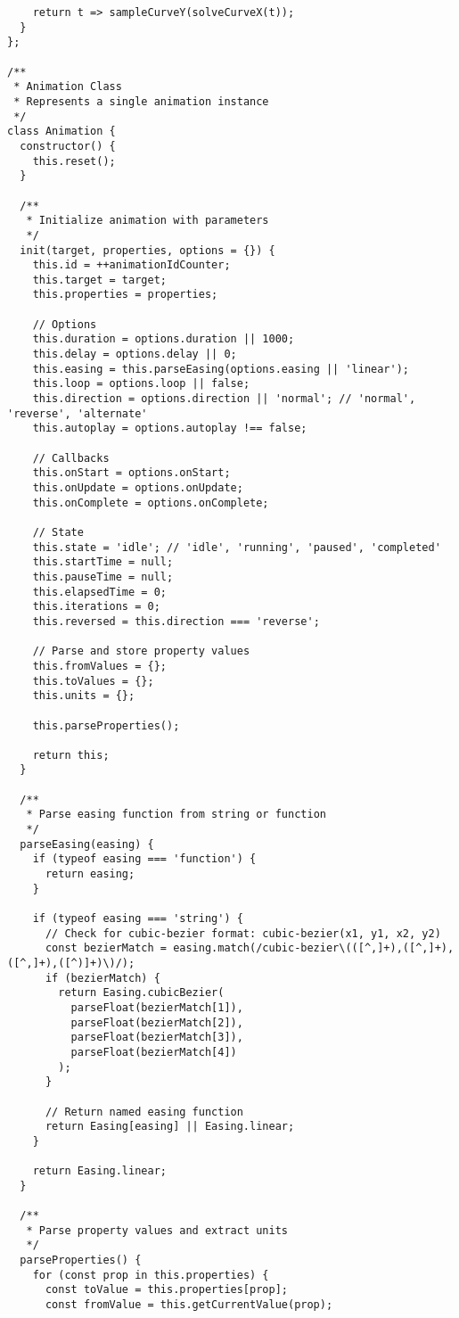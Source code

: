 \documentclass[11pt]{article}
\begin{document}
\begin{verbatim}
    return t => sampleCurveY(solveCurveX(t));
  }
};

/**
 * Animation Class
 * Represents a single animation instance
 */
class Animation {
  constructor() {
    this.reset();
  }
  
  /**
   * Initialize animation with parameters
   */
  init(target, properties, options = {}) {
    this.id = ++animationIdCounter;
    this.target = target;
    this.properties = properties;
    
    // Options
    this.duration = options.duration || 1000;
    this.delay = options.delay || 0;
    this.easing = this.parseEasing(options.easing || 'linear');
    this.loop = options.loop || false;
    this.direction = options.direction || 'normal'; // 'normal', 'reverse', 'alternate'
    this.autoplay = options.autoplay !== false;
    
    // Callbacks
    this.onStart = options.onStart;
    this.onUpdate = options.onUpdate;
    this.onComplete = options.onComplete;
    
    // State
    this.state = 'idle'; // 'idle', 'running', 'paused', 'completed'
    this.startTime = null;
    this.pauseTime = null;
    this.elapsedTime = 0;
    this.iterations = 0;
    this.reversed = this.direction === 'reverse';
    
    // Parse and store property values
    this.fromValues = {};
    this.toValues = {};
    this.units = {};
    
    this.parseProperties();
    
    return this;
  }
  
  /**
   * Parse easing function from string or function
   */
  parseEasing(easing) {
    if (typeof easing === 'function') {
      return easing;
    }
    
    if (typeof easing === 'string') {
      // Check for cubic-bezier format: cubic-bezier(x1, y1, x2, y2)
      const bezierMatch = easing.match(/cubic-bezier\(([^,]+),([^,]+),([^,]+),([^)]+)\)/);
      if (bezierMatch) {
        return Easing.cubicBezier(
          parseFloat(bezierMatch[1]),
          parseFloat(bezierMatch[2]),
          parseFloat(bezierMatch[3]),
          parseFloat(bezierMatch[4])
        );
      }
      
      // Return named easing function
      return Easing[easing] || Easing.linear;
    }
    
    return Easing.linear;
  }
  
  /**
   * Parse property values and extract units
   */
  parseProperties() {
    for (const prop in this.properties) {
      const toValue = this.properties[prop];
      const fromValue = this.getCurrentValue(prop);
      

\end{verbatim}
\end{document}
